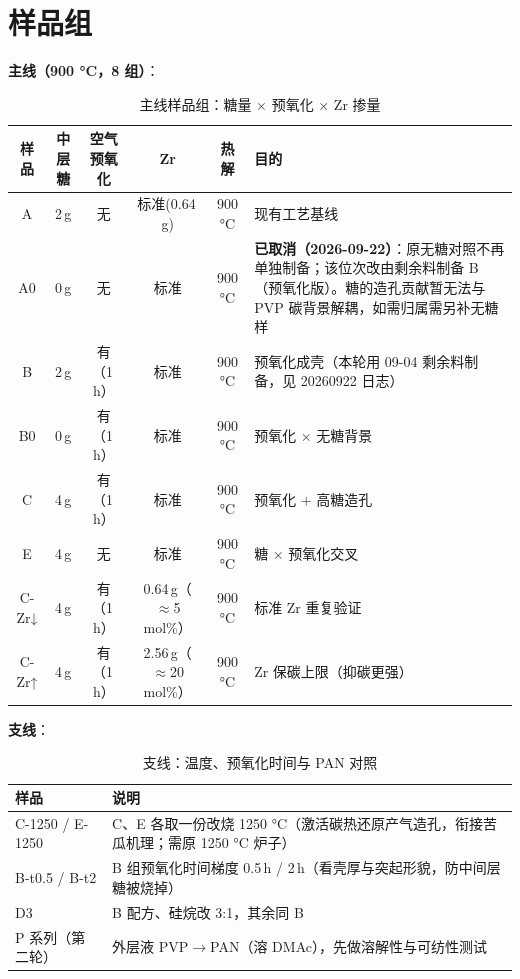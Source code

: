 \section{样品组}

\textbf{主线（900 °C，8 组）}：

\begin{table}[htbp]
\centering
\caption{主线样品组：糖量 × 预氧化 × Zr 掺量}
\begin{tabularx}{\textwidth}{cccccX}
\toprule
样品 & 中层糖 & 空气预氧化 & Zr & 热解 & 目的 \\
\midrule
A   & 2\,g & 无       & 标准(0.64\,g) & 900 °C & 现有工艺基线 \\
A0  & 0\,g & 无       & 标准          & 900 °C & \textbf{已取消（2026-09-22）}：原无糖对照不再单独制备；该位次改由剩余料制备 B（预氧化版）。糖的造孔贡献暂无法与 PVP 碳背景解耦，如需归属需另补无糖样 \\
B   & 2\,g & 有（1\,h） & 标准         & 900 °C & 预氧化成壳（本轮用 09-04 剩余料制备，见 20260922 日志） \\
B0  & 0\,g & 有（1\,h） & 标准         & 900 °C & 预氧化 × 无糖背景 \\
C   & 4\,g & 有（1\,h） & 标准         & 900 °C & 预氧化 + 高糖造孔 \\
E   & 4\,g & 无       & 标准          & 900 °C & 糖 × 预氧化交叉 \\
C-Zr↓ & 4\,g & 有（1\,h） & 0.64\,g（$\approx$5 mol\%） & 900 °C & 标准 Zr 重复验证 \\
C-Zr↑ & 4\,g & 有（1\,h） & 2.56\,g（$\approx$20 mol\%） & 900 °C & Zr 保碳上限（抑碳更强） \\
\bottomrule
\end{tabularx}
\end{table}

\textbf{支线}：

\begin{table}[htbp]
\centering
\caption{支线：温度、预氧化时间与 PAN 对照}
\begin{tabularx}{\textwidth}{lX}
\toprule
样品 & 说明 \\
\midrule
C-1250 / E-1250 & C、E 各取一份改烧 1250 °C（激活碳热还原产气造孔，衔接苦瓜机理；需原 1250 °C 炉子） \\
B-t0.5 / B-t2 & B 组预氧化时间梯度 0.5\,h / 2\,h（看壳厚与突起形貌，防中间层糖被烧掉） \\
D3 & B 配方、硅烷改 3:1，其余同 B \\
P 系列（第二轮） & 外层液 PVP$\rightarrow$PAN（溶 DMAc），先做溶解性与可纺性测试 \\
\bottomrule
\end{tabularx}
\end{table}

